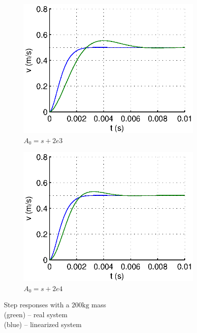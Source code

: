 \begin{figure}[hb]
  \centering
  \begin{subfigure}[b]{\linewidth}
   \includegraphics[width=\columnwidth]{fig/step_m_w0eqwm.eps}
   \caption{$A_0 = s+2e3$}
  \end{subfigure}
  \begin{subfigure}[b]{\linewidth}
  \includegraphics[width=\columnwidth]{fig/step_m_w0eq10wm.eps}
   \caption{$A_0 = s + 2e4$}
  \end{subfigure}
 \caption{Step responses with a $200\text{kg}$ mass \\ (green) -- real system \\ (blue) -- linearized system}
 \label{mass}
\end{figure}

